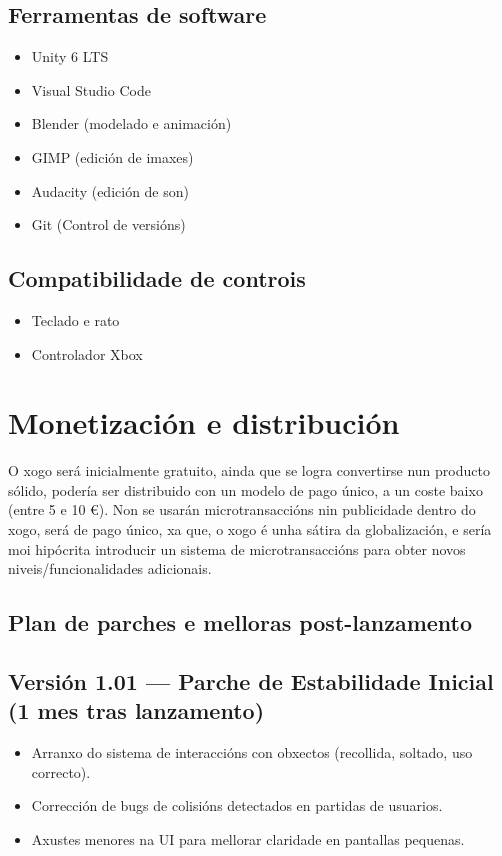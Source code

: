 \documentclass{report}  %
\begin{document}
\subsection{Ferramentas de software}
\begin{itemize}
    \item Unity 6 LTS
    \item Visual Studio Code
    \item Blender (modelado e animación)
    \item GIMP (edición de imaxes)
    \item Audacity (edición de son)
    \item Git (Control de versións)
\end{itemize}
\subsection{Compatibilidade de controis}
\begin{itemize}
    \item Teclado e rato
    \item Controlador Xbox
\end{itemize}

\section{Monetización e distribución}
O xogo será inicialmente gratuito, ainda que se logra convertirse nun producto sólido, podería ser distribuido con un modelo de pago único, a un coste baixo (entre 5 e 10 €). Non se usarán microtransaccións nin publicidade dentro do xogo, será de pago único, xa que, o xogo é unha sátira da globalización, e sería moi hipócrita introducir un sistema de microtransaccións para obter novos niveis/funcionalidades adicionais.
\subsection{Plan de parches e melloras post-lanzamento}

\subsection*{Versión 1.01 — Parche de Estabilidade Inicial (1 mes tras lanzamento)}
\begin{itemize}
    \item Arranxo do sistema de interaccións con obxectos (recollida, soltado, uso correcto).
    \item Corrección de bugs de colisións detectados en partidas de usuarios.
    \item Axustes menores na UI para mellorar claridade en pantallas pequenas.
\end{itemize}
\end{document}
